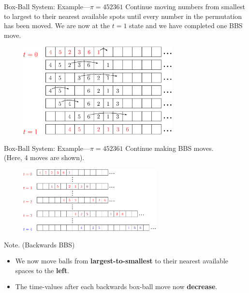 \documentclass[aspectratio=169, serif]{beamer}
\begin{document}
    \begin{frame}{Box-Ball System: Example---$\pi=452361$}
        \phantom{---}Continue moving numbers from smallest to largest to their nearest available spots until every number in the permutation has been moved. We are now at the $t=1$ state and we have completed one BBS move.
        \pause
        \begin{figure}
            \centering
                \includegraphics[width = 3.2in]{Step3.eps}
        \end{figure}
    \end{frame}
    \begin{frame}{Box-Ball System: Example---$\pi=452361$}
        \phantom{---}Continue making BBS moves.\\
        (Here, 4 moves are shown).
        \begin{figure}
            \centering
            \includegraphics[width = 2.85in]{Step4V2.eps}
            \end{figure}
    \pause
    \begin{block}{Note. (Backwards BBS)}
    \begin{itemize}
    \small
        \item We now move balls from \textbf{largest-to-smallest} to their nearest available spaces to the \textbf{left}.
        \item The time-values after each backwards box-ball move now \textbf{decrease}. 
    \end{itemize}
    \end{block}
\end{frame}
\end{document}
